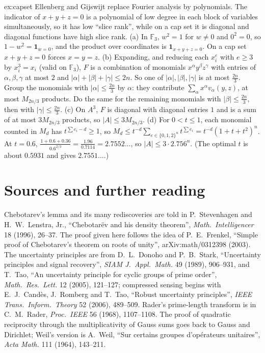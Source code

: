 \begin{solution}{ex:capset}
\idea Ellenberg and Gijswijt replace Fourier analysis by polynomials. The indicator of $x+y+z=0$ is a polynomial of low degree in
each block of variables simultaneously, so it has low ``slice rank'', while on a cap set it is diagonal and diagonal functions have high
slice rank.
\writeup (a) In $\mathbb F_3$, $w^2=1$ for $w\ne0$ and $0^2=0$, so $1-w^2=\mathbf 1_{w=0}$, and the product over coordinates is $\mathbf 1_{x+y+z=0}$. On a cap set
$x+y+z=0$ forces $x=y=z$. (b) Expanding, and reducing each $x_i^{e}$ with $e\ge3$ by $x_i^3=x_i$ (valid on $\mathbb F_3$), $F$ is a combination of monomials
$x^\alpha y^\beta z^\gamma$ with entries of $\alpha,\beta,\gamma$ at most $2$ and $|\alpha|+|\beta|+|\gamma|\le2n$. So one of $|\alpha|,|\beta|,|\gamma|$ is at most $\frac{2n}3$. Group the
monomials with $|\alpha|\le\frac{2n}3$ by $\alpha$: they contribute $\sum_\alpha x^\alpha v_\alpha(y,z)$, at most $M_{2n/3}$ products. Do the same for the remaining monomials
with $|\beta|\le\frac{2n}3$, then with $|\gamma|\le\frac{2n}3$. (c) On $A^3$, $F$ is diagonal with diagonal entries $1$ and is a sum of at most $3M_{2n/3}$ products, so
$|A|\le3M_{2n/3}$. (d) For $0<t\le1$, each monomial counted in $M_d$ has $t^{\sum e_i-d}\ge1$, so $M_d\le t^{-d}\sum_{e\in\{0,1,2\}^n}t^{\sum e_i}=t^{-d}(1+t+t^2)^n$.
At $t=0.6$, $\frac{1+0.6+0.36}{0.6^{2/3}}=\frac{1.96}{0.7114}=2.7552\ldots$, so $|A|\le3\cdot2.756^n$. (The optimal $t$ is about $0.5931$ and gives
$2.7551\ldots$.)
\end{solution}

\section*{Sources and further reading}

Chebotarev's lemma and its many rediscoveries are told in P.~Stevenhagen and H.~W.~Lenstra, Jr., ``Chebotar\"ev and his density theorem'',
\emph{Math.\ Intelligencer} 18 (1996), 26--37. The proof given here follows the idea of P.~E.~Frenkel, ``Simple proof of Chebotarev's theorem on
roots of unity'', arXiv:math/0312398 (2003). The uncertainty principles are from D.~L.~Donoho and P.~B.~Stark, ``Uncertainty principles and
signal recovery'', \emph{SIAM J.\ Appl.\ Math.} 49 (1989), 906--931, and T.~Tao, ``An uncertainty principle for cyclic groups of prime order'',
\emph{Math.\ Res.\ Lett.} 12 (2005), 121--127; compressed sensing begins with E.~J.~Cand\`es, J.~Romberg and T.~Tao, ``Robust uncertainty
principles'', \emph{IEEE Trans.\ Inform.\ Theory} 52 (2006), 489--509. Rader's prime-length transform is in C.~M.~Rader, \emph{Proc.\ IEEE} 56 (1968),
1107--1108. The proof of quadratic reciprocity through the multiplicativity of Gauss sums goes back to Gauss and Dirichlet; Weil's version is
A.~Weil, ``Sur certains groupes d'op\'erateurs unitaires'', \emph{Acta Math.} 111 (1964), 143--211.

